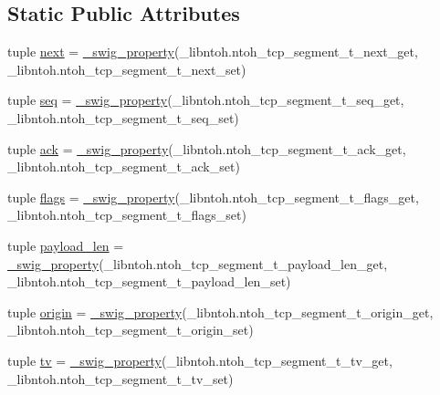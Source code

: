 \subsection*{Static Public Attributes}
\begin{DoxyCompactItemize}
\item 
tuple \hyperlink{classlibntoh_1_1ntoh__tcp__segment__t_a84e6dac37062f5a539ece8248c8567cc}{next} = \hyperlink{namespacelibntoh_ae6f5626f776538e0cdb00e75ca1c96c9}{\-\_\-swig\-\_\-property}(\-\_\-libntoh.\-ntoh\-\_\-tcp\-\_\-segment\-\_\-t\-\_\-next\-\_\-get, \-\_\-libntoh.\-ntoh\-\_\-tcp\-\_\-segment\-\_\-t\-\_\-next\-\_\-set)
\item 
tuple \hyperlink{classlibntoh_1_1ntoh__tcp__segment__t_a716df55a3150c1225ef8612669f6b901}{seq} = \hyperlink{namespacelibntoh_ae6f5626f776538e0cdb00e75ca1c96c9}{\-\_\-swig\-\_\-property}(\-\_\-libntoh.\-ntoh\-\_\-tcp\-\_\-segment\-\_\-t\-\_\-seq\-\_\-get, \-\_\-libntoh.\-ntoh\-\_\-tcp\-\_\-segment\-\_\-t\-\_\-seq\-\_\-set)
\item 
tuple \hyperlink{classlibntoh_1_1ntoh__tcp__segment__t_a0ccc7a1fc96dc8394903666fc5eb23eb}{ack} = \hyperlink{namespacelibntoh_ae6f5626f776538e0cdb00e75ca1c96c9}{\-\_\-swig\-\_\-property}(\-\_\-libntoh.\-ntoh\-\_\-tcp\-\_\-segment\-\_\-t\-\_\-ack\-\_\-get, \-\_\-libntoh.\-ntoh\-\_\-tcp\-\_\-segment\-\_\-t\-\_\-ack\-\_\-set)
\item 
tuple \hyperlink{classlibntoh_1_1ntoh__tcp__segment__t_a9ceb38153d5c0f156fbeada6dc00ff4f}{flags} = \hyperlink{namespacelibntoh_ae6f5626f776538e0cdb00e75ca1c96c9}{\-\_\-swig\-\_\-property}(\-\_\-libntoh.\-ntoh\-\_\-tcp\-\_\-segment\-\_\-t\-\_\-flags\-\_\-get, \-\_\-libntoh.\-ntoh\-\_\-tcp\-\_\-segment\-\_\-t\-\_\-flags\-\_\-set)
\item 
tuple \hyperlink{classlibntoh_1_1ntoh__tcp__segment__t_a2d1aae70ae5f00aa8688e5a4004af497}{payload\-\_\-len} = \hyperlink{namespacelibntoh_ae6f5626f776538e0cdb00e75ca1c96c9}{\-\_\-swig\-\_\-property}(\-\_\-libntoh.\-ntoh\-\_\-tcp\-\_\-segment\-\_\-t\-\_\-payload\-\_\-len\-\_\-get, \-\_\-libntoh.\-ntoh\-\_\-tcp\-\_\-segment\-\_\-t\-\_\-payload\-\_\-len\-\_\-set)
\item 
tuple \hyperlink{classlibntoh_1_1ntoh__tcp__segment__t_a8b9d7517c215a6690dc57a59f2e58a46}{origin} = \hyperlink{namespacelibntoh_ae6f5626f776538e0cdb00e75ca1c96c9}{\-\_\-swig\-\_\-property}(\-\_\-libntoh.\-ntoh\-\_\-tcp\-\_\-segment\-\_\-t\-\_\-origin\-\_\-get, \-\_\-libntoh.\-ntoh\-\_\-tcp\-\_\-segment\-\_\-t\-\_\-origin\-\_\-set)
\item 
tuple \hyperlink{classlibntoh_1_1ntoh__tcp__segment__t_ae8cd99ed1999062cbd69ce770384d6e4}{tv} = \hyperlink{namespacelibntoh_ae6f5626f776538e0cdb00e75ca1c96c9}{\-\_\-swig\-\_\-property}(\-\_\-libntoh.\-ntoh\-\_\-tcp\-\_\-segment\-\_\-t\-\_\-tv\-\_\-get, \-\_\-libntoh.\-ntoh\-\_\-tcp\-\_\-segment\-\_\-t\-\_\-tv\-\_\-set)

\end{DoxyCompactItemize}
